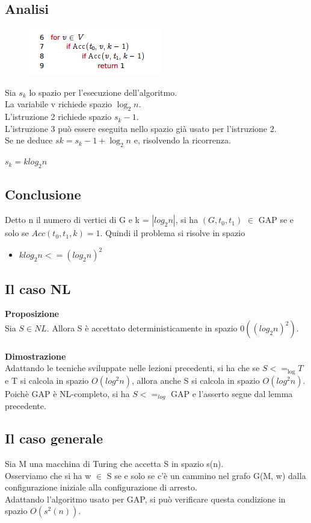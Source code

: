 \subsection{Analisi}
\begin{figure}[htp]
    \includegraphics[scale=0.8]{tesi_stile/img/foto4cap18.png}
\end{figure}
Sia $s_k$ lo spazio per l’esecuzione dell’algoritmo.\\
La variabile v richiede spazio $\log_2 n$.\\
L’istruzione 2 richiede spazio $s_k-1$.\\
L’istruzione 3 può essere eseguita nello spazio già usato per l’istruzione 2.\\
Se ne deduce $sk = s_k-1 + \log_2n$ e, risolvendo la ricorrenza.\\
\begin{center}
    $s_k = k log_2 n$
\end{center}
\subsection{Conclusione}
Detto n il numero di vertici di G e k = $|log_2 n|$, si ha $(G,t_0,t_1)$ $\in$ GAP se e solo se $Acc(t_0,t_1, k) = 1$. Quindi il problema si risolve in spazio
\begin{itemize}
    \item $klog_2 n <= (log_2 n)^2$
\end{itemize}
\subsection{Il caso NL}
\textbf{Proposizione}\\
Sia $S \in NL$. Allora S è accettato deterministicamente in spazio $0((log_2n)^2)$.\\\\
\textbf{Dimostrazione}\\
Adattando le tecniche sviluppate nelle lezioni precedenti, si ha che se $S <=_{\log} T$ e T si calcola in spazio $O(log^2 n)$, allora anche S si calcola in spazio $O(log^2 n)$. Poichè GAP è NL-completo, si ha $S <=_{log}$ GAP e l’asserto segue dal lemma precedente.
\subsection{Il caso generale}
Sia M una macchina di Turing che accetta S in spazio s(n).\\
Osserviamo che si ha w $\in$ S se e solo se c’è un cammino nel grafo G(M, w) dalla configurazione iniziale alla configurazione di arresto.
\\Adattando l’algoritmo usato per GAP, si può verificare questa condizione in
spazio $O(s^2(n))$.
